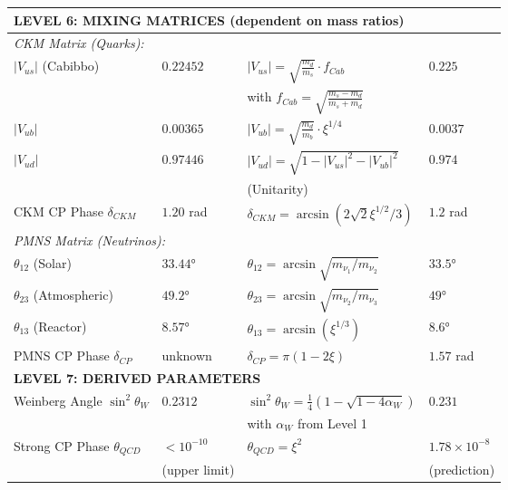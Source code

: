 \documentclass[12pt,a4paper]{article}
\begin{document}
\begin{longtable}{p{4.5cm}p{3.5cm}p{3.5cm}p{3.5cm}}
		\midrule
		\multicolumn{4}{l}{\textbf{LEVEL 6: MIXING MATRICES (dependent on mass ratios)}} \\
		\midrule
		
		\multicolumn{4}{l}{\textit{CKM Matrix (Quarks):}} \\
		
		$|V_{us}|$ (Cabibbo) & $0.22452$ & $|V_{us}| = \sqrt{\frac{m_d}{m_s}} \cdot f_{Cab}$ & $0.225$ \\
		& & with $f_{Cab} = \sqrt{\frac{m_s - m_d}{m_s + m_d}}$ & \\[0.3em]
		
		$|V_{ub}|$ & $0.00365$ & $|V_{ub}| = \sqrt{\frac{m_d}{m_b}} \cdot \xi^{1/4}$ & $0.0037$ \\
		
		$|V_{ud}|$ & $0.97446$ & $|V_{ud}| = \sqrt{1 - |V_{us}|^2 - |V_{ub}|^2}$ & $0.974$ \\
		& & (Unitarity) & \\[0.3em]
		
		CKM CP Phase $\delta_{CKM}$ & $1.20$ rad & $\delta_{CKM} = \arcsin(2\sqrt{2}\xi^{1/2}/3)$ & $1.2$ rad \\
		
		\multicolumn{4}{l}{\textit{PMNS Matrix (Neutrinos):}} \\
		
		$\theta_{12}$ (Solar) & $33.44°$ & $\theta_{12} = \arcsin\sqrt{m_{\nu_1}/m_{\nu_2}}$ & $33.5°$ \\
		
		$\theta_{23}$ (Atmospheric) & $49.2°$ & $\theta_{23} = \arcsin\sqrt{m_{\nu_2}/m_{\nu_3}}$ & $49°$ \\
		
		$\theta_{13}$ (Reactor) & $8.57°$ & $\theta_{13} = \arcsin(\xi^{1/3})$ & $8.6°$ \\
		
		PMNS CP Phase $\delta_{CP}$ & unknown & $\delta_{CP} = \pi(1 - 2\xi)$ & $1.57$ rad \\
		
		\midrule
		\multicolumn{4}{l}{\textbf{LEVEL 7: DERIVED PARAMETERS}} \\
		\midrule
		
		Weinberg Angle $\sin^2\theta_W$ & $0.2312$ & $\sin^2\theta_W = \frac{1}{4}(1-\sqrt{1-4\alpha_W})$ & $0.231$ \\
		& & with $\alpha_W$ from Level 1 & \\[0.3em]
		
		Strong CP Phase $\theta_{QCD}$ & $< 10^{-10}$ & $\theta_{QCD} = \xi^{2}$ & $1.78 \times 10^{-8}$ \\
		& (upper limit) & & (prediction) \\
		
	\end{longtable}
	
\end{document}
